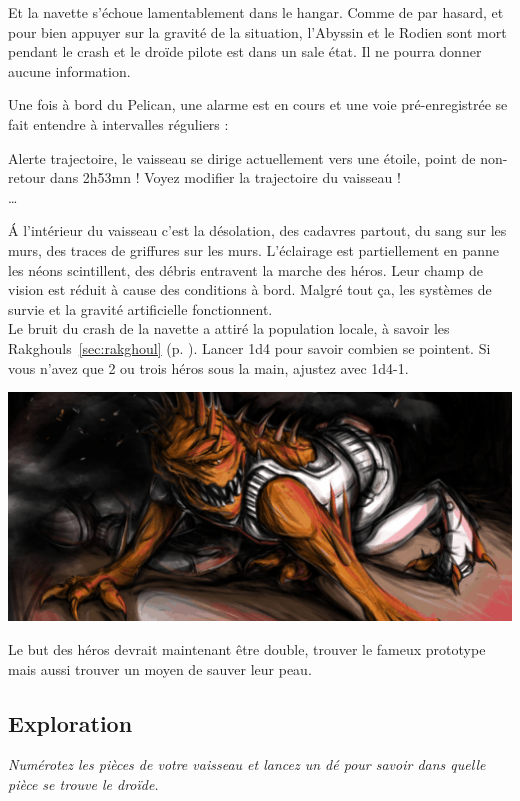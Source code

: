 Et la navette s’échoue lamentablement dans le hangar. Comme de par hasard, et pour bien appuyer sur la gravité de la situation, l’Abyssin et le Rodien sont mort pendant le crash et le droïde pilote est dans un sale état. Il ne pourra donner aucune information.

Une fois à bord du Pelican, une alarme est en cours et une voie pré-enregistrée se fait entendre à intervalles réguliers :

\begin{quotebox}
	Alerte trajectoire, le vaisseau se dirige actuellement vers une étoile, point de non-retour dans 2h53mn ! 
	Voyez modifier la trajectoire du vaisseau !\\ 
	\ldots
\end{quotebox}

\'A l’intérieur du vaisseau c’est la désolation, des cadavres partout, du sang sur les murs, des traces de griffures sur les murs. L’éclairage est partiellement en panne les néons scintillent, des débris entravent la marche des héros. Leur champ de vision est réduit à cause des conditions à bord. Malgré tout ça, les systèmes de survie et la gravité artificielle fonctionnent.\\

Le bruit du crash de la navette a attiré la population locale, à savoir les Rakghouls~\ref{sec:rakghoul} (p. \pageref{sec:rakghoul}). Lancer 1d4 pour savoir combien se pointent. Si vous n’avez que 2 ou trois héros sous la main, ajustez avec 1d4-1.

\noindent\includegraphics[width=\linewidth]{_img/dos-au-muur/rakghoul.png}

Le but des héros devrait maintenant être double, trouver le fameux prototype mais aussi trouver un moyen de sauver leur peau. 

\subsection{Exploration}
\emph{Numérotez les pièces de votre vaisseau et lancez un dé pour savoir dans quelle pièce se trouve le droïde.}\\

